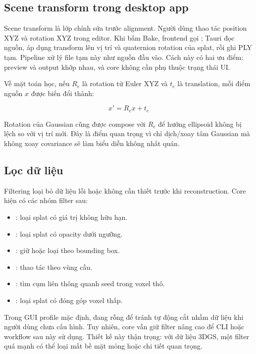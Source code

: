 \subsection{Scene transform trong desktop app}

Scene transform là lớp chỉnh sửa trước alignment. Người dùng thao tác position XYZ và rotation XYZ trong editor. Khi bấm Bake, frontend gọi ; Tauri đọc nguồn, áp dụng transform lên vị trí và quaternion rotation của splat, rồi ghi PLY tạm. Pipeline xử lý file tạm này như nguồn đầu vào. Cách này có hai ưu điểm: preview và output khớp nhau, và core không cần phụ thuộc trạng thái UI.

Về mặt toán học, nếu $R_e$ là rotation từ Euler XYZ và $t_e$ là translation, mỗi điểm nguồn $x$ được biến đổi thành:

\[
x' = R_e x + t_e
\]

Rotation của Gaussian cũng được compose với $R_e$ để hướng ellipsoid không bị lệch so với vị trí mới. Đây là điểm quan trọng vì chỉ dịch/xoay tâm Gaussian mà không xoay covariance sẽ làm biểu diễn không nhất quán.

\subsection{Lọc dữ liệu}

Filtering loại bỏ dữ liệu lỗi hoặc không cần thiết trước khi reconstruction. Core hiện có các nhóm filter sau:

\begin{itemize}
  \item {}: loại splat có giá trị không hữu hạn.
  \item {}: loại splat có opacity dưới ngưỡng.
  \item {}: giữ hoặc loại theo bounding box.
  \item {}: thao tác theo vùng cầu.
  \item {}: tìm cụm liên thông quanh seed trong voxel thô.
  \item {}: loại splat có đóng góp voxel thấp.
\end{itemize}

Trong GUI profile mặc định,  đang rỗng để tránh tự động cắt nhầm dữ liệu khi người dùng chưa cấu hình. Tuy nhiên, core vẫn giữ filter nâng cao để CLI hoặc workflow sau này sử dụng. Thiết kế này thận trọng: với dữ liệu 3DGS, một filter quá mạnh có thể loại mất bề mặt mỏng hoặc chi tiết quan trọng.

